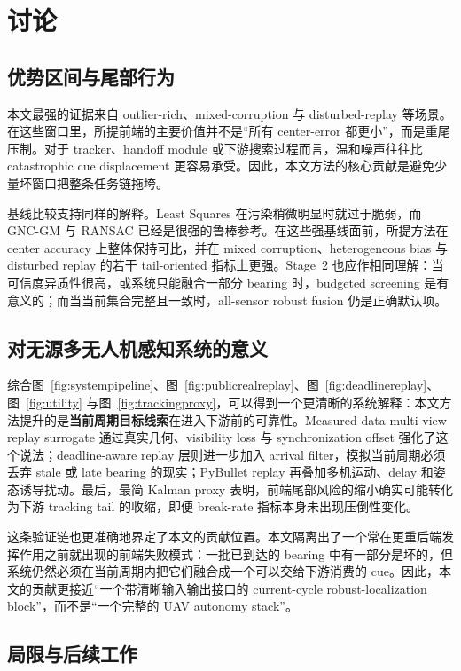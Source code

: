 \documentclass[drones,article,submit,moreauthors]{Definitions/mdpi}
\begin{document}
\section{讨论}

\subsection{优势区间与尾部行为}

本文最强的证据来自 outlier-rich、mixed-corruption 与 disturbed-replay 等场景。在这些窗口里，所提前端的主要价值并不是“所有 center-error 都更小”，而是重尾压制。对于 tracker、handoff module 或下游搜索过程而言，温和噪声往往比 catastrophic cue displacement 更容易承受。因此，本文方法的核心贡献是避免少量坏窗口把整条任务链拖垮。

基线比较支持同样的解释。Least Squares 在污染稍微明显时就过于脆弱，而 GNC-GM 与 RANSAC 已经是很强的鲁棒参考。在这些强基线面前，所提方法在 center accuracy 上整体保持可比，并在 mixed corruption、heterogeneous bias 与 disturbed replay 的若干 tail-oriented 指标上更强。Stage~2 也应作相同理解：当可信度异质性很高，或系统只能融合一部分 bearing 时，budgeted screening 是有意义的；而当当前集合完整且一致时，all-sensor robust fusion 仍是正确默认项。

\subsection{对无源多无人机感知系统的意义}

综合图~\ref{fig:systempipeline}、图~\ref{fig:publicrealreplay}、图~\ref{fig:deadlinereplay}、图~\ref{fig:utility} 与图~\ref{fig:trackingproxy}，可以得到一个更清晰的系统解释：本文方法提升的是\textbf{当前周期目标线索}在进入下游前的可靠性。Measured-data multi-view replay surrogate 通过真实几何、visibility loss 与 synchronization offset 强化了这个说法；deadline-aware replay 层则进一步加入 arrival filter，模拟当前周期必须丢弃 stale 或 late bearing 的现实；PyBullet replay 再叠加多机运动、delay 和姿态诱导扰动。最后，最简 Kalman proxy 表明，前端尾部风险的缩小确实可能转化为下游 tracking tail 的收缩，即便 break-rate 指标本身未出现压倒性变化。

这条验证链也更准确地界定了本文的贡献位置。本文隔离出了一个常在更重后端发挥作用之前就出现的前端失败模式：一批已到达的 bearing 中有一部分是坏的，但系统仍然必须在当前周期内把它们融合成一个可以交给下游消费的 cue。因此，本文的贡献更接近“一个带清晰输入输出接口的 current-cycle robust-localization block”，而不是“一个完整的 UAV autonomy stack”。

\subsection{局限与后续工作}
\end{document}
